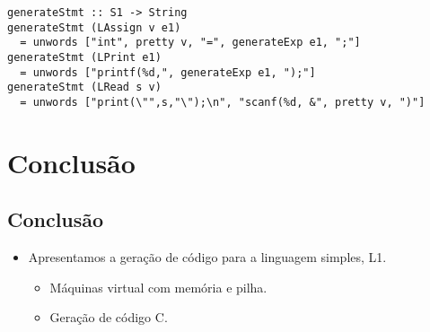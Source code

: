 \documentclass[11pt]{article}
\begin{document}
\begin{verbatim}
generateStmt :: S1 -> String
generateStmt (LAssign v e1)
  = unwords ["int", pretty v, "=", generateExp e1, ";"]
generateStmt (LPrint e1)
  = unwords ["printf(%d,", generateExp e1, ");"]
generateStmt (LRead s v)
  = unwords ["print(\"",s,"\");\n", "scanf(%d, &", pretty v, ")"]
\end{verbatim}
\section*{Conclusão}
\label{sec:org58e0ea0}

\subsection*{Conclusão}
\label{sec:org0dada57}

\begin{itemize}
\item Apresentamos a geração de código para a linguagem simples, L1.
\begin{itemize}
\item Máquinas virtual com memória e pilha.
\item Geração de código C.
\end{itemize}
\end{itemize}
\end{document}
